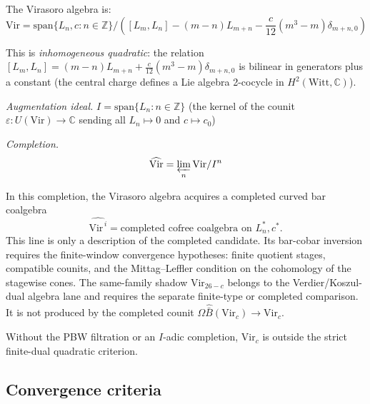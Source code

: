 \begin{example}\label{ex:virasoro-i-adic}
The Virasoro algebra is:
\[\text{Vir} = \text{span}\{L_n, c : n \in \mathbb{Z}\} /
([L_m, L_n] - (m-n)L_{m+n} - \frac{c}{12}(m^3 - m)\delta_{m+n,0})\]

This is \emph{inhomogeneous quadratic}: the relation $[L_m, L_n] = (m-n)L_{m+n} + \frac{c}{12}(m^3-m)\delta_{m+n,0}$ is bilinear in generators plus a constant (the central charge defines a Lie algebra 2-cocycle in $H^2(\mathrm{Witt}, \mathbb{C})$).

\emph{Augmentation ideal.} $I = \text{span}\{L_n : n \in \mathbb{Z}\}$ (the kernel of the counit $\varepsilon: U(\mathrm{Vir}) \to \mathbb{C}$ sending all $L_n \mapsto 0$ and $c \mapsto c_0$)

\emph{Completion.}
\[\widehat{\text{Vir}} = \varprojlim_n \text{Vir} / I^n\]

In this completion, the Virasoro algebra acquires a completed curved
bar coalgebra
\[
\widehat{\text{Vir}^{\,i}}
 = \text{completed cofree coalgebra on } L_n^*, c^* .
\]
This line is only a description of the completed candidate. Its
bar-cobar inversion requires the finite-window convergence hypotheses:
finite quotient stages, compatible counits, and the
Mittag--Leffler condition on the cohomology of the stagewise cones.
The same-family shadow $\mathrm{Vir}_{26-c}$ belongs to the
Verdier/Koszul-dual algebra lane and requires the separate finite-type
or completed comparison. It is not produced by the completed counit
$\Omega\widehat{\bar B}(\mathrm{Vir}_c)\to \mathrm{Vir}_c$.

Without the PBW filtration or an $I$-adic completion,
$\mathrm{Vir}_c$ is outside the strict finite-dual quadratic criterion.
\end{example}

\subsection{Convergence criteria}

